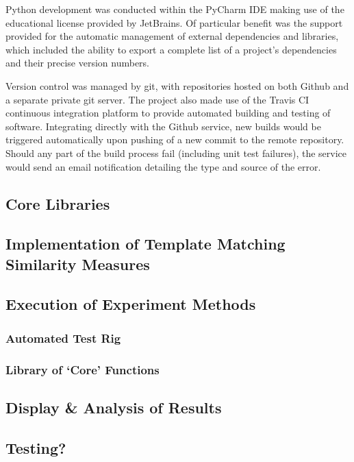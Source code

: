 Python development was conducted within the PyCharm IDE making use of the educational license provided by JetBrains. Of particular benefit was the support provided for the automatic management of external dependencies and libraries, which included the ability to export a complete list of a project's dependencies and their precise version numbers.

Version control was managed by git, with repositories hosted on both Github and a separate private git server. The project also made use of the Travis CI continuous integration platform to provide automated building and testing of software. Integrating directly with the Github service, new builds would be triggered automatically upon pushing of a new commit to the remote repository. Should any part of the build process fail (including unit test failures), the service would send an email notification detailing the type and source of the error.  

\subsection{Core Libraries}



\subsection{Implementation of Template Matching Similarity Measures}

\subsection{Execution of Experiment Methods}

\subsubsection{Automated Test Rig}

\subsubsection{Library of `Core' Functions}

\subsection{Display \& Analysis of Results}

\subsection{Testing?}

